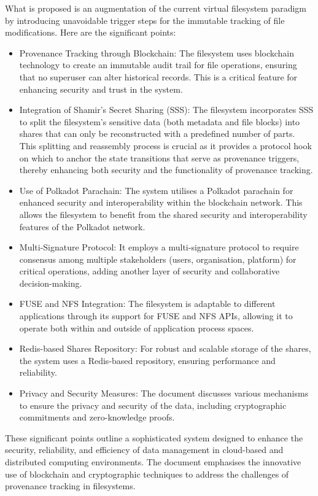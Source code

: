 \documentclass{tufte-handout}
\begin{document}
What is proposed is an augmentation of the current virtual filesystem paradigm by introducing unavoidable trigger steps for the immutable tracking of file
modifications. Here are the significant points:
\begin{itemize}
  \item Provenance Tracking through Blockchain: The filesystem uses blockchain technology to create an immutable audit trail for file operations, ensuring that no
superuser can alter historical records. This is a critical feature for enhancing security and trust in the system.
  \item Integration of Shamir's Secret Sharing (SSS): The filesystem incorporates SSS to split the filesystem's sensitive data (both metadata and file blocks) into shares that can
  only be reconstructed with a predefined number of parts. This splitting and reassembly process is crucial as it provides a protocol hook on which to anchor the
  state transitions that serve as provenance triggers, thereby enhancing both security and the functionality of provenance tracking.
  \item Use of Polkadot Parachain: The system utilises a Polkadot parachain for enhanced security and interoperability within the blockchain network. This allows the
filesystem to benefit from the shared security and interoperability features of the Polkadot network.
\item Multi-Signature Protocol: It employs a multi-signature protocol to require consensus among multiple stakeholders (users, organisation, platform) for critical operations, adding another
layer of security and collaborative decision-making.
\item FUSE and NFS Integration: The filesystem is adaptable to different applications through its support for FUSE and NFS APIs, allowing it to operate both within
and outside of application process spaces.
\item Redis-based Shares Repository: For robust and scalable storage of the shares, the system uses a Redis-based repository, ensuring performance and reliability.
\item Privacy and Security Measures: The document discusses various mechanisms to ensure the privacy and security of the data, including cryptographic commitments and zero-knowledge proofs.
\end{itemize}
These significant points outline a sophisticated system designed to enhance the security, reliability, and efficiency of data management in cloud-based and distributed
computing environments. The document emphasises the innovative use of blockchain and cryptographic techniques to address the challenges of provenance tracking in
filesystems.
\end{document}
